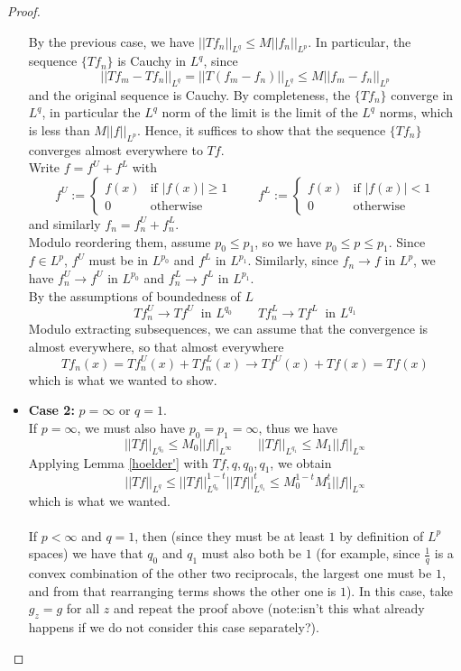 \begin{proof}
\begin{itemize}
{\begin{itemize}
{            By the previous case, we have $||Tf_n||_{L^q} \leq M ||f_n||_{L^p}$. In particular, the sequence $\{Tf_n\}$ is Cauchy in $L^q$, since
            \[ ||Tf_m - Tf_n||_{L^q} = ||T(f_m-f_n)||_{L^q} \leq M ||f_m - f_n||_{L^p} \]
            and the original sequence is Cauchy. By completeness, the $\{Tf_n\}$ converge in $L^q$, in particular the $L^q$ norm of the limit is the limit of the $L^q$ norms, which is less than $M ||f||_{L^p}$.
            Hence, it suffices to show that the sequence $\{Tf_n\}$ converges almost everywhere to $Tf$.\\
            Write $f= f^U + f^L$ with
            \[ f^U := \begin{cases} f(x) & \text{if } |f(x)|\geq 1 \\ 0 & \text{otherwise} \end{cases} \qquad f^L := \begin{cases} f(x) & \text{if } |f(x)|< 1 \\ 0 & \text{otherwise} \end{cases}  \]
            and similarly $f_n = f_n^U + f_n^L$.\\
            Modulo reordering them, assume $p_0 \leq p_1$, so we have $p_0 \leq p \leq p_1$. Since $f\in L^p$, $f^U$ must be in $L^{p_0}$ and $f^L$ in $L^{p_1}$.
            Similarly, since $f_n \to f$ in $L^p$, we have $f_n^U \to f^U$ in $L^{p_0}$ and $f_n^L \to f^L$ in $L^{p_1}$.\\
            By the assumptions of boundedness of $L$
            \[ Tf_n^U \to Tf^U \ \text{ in } L^{q_0} \qquad Tf_n^L \to Tf^L \ \text{ in } L^{q_1} \]
            Modulo extracting subsequences, we can assume that the convergence is almost everywhere, so that almost everywhere
            \[ Tf_n (x) = Tf_n^U (x) + Tf_n^L(x) \to Tf^U (x) + Tf(x) = Tf (x)\]
            which is what we wanted to show.
            }
        \end{itemize}
        }
        \item{\textbf{Case 2:} $p=\infty$ or $q=1$.\\
        If $p=\infty$, we must also have $p_0=p_1=\infty$, thus we have
        \[ ||Tf||_{L^{q_0}} \leq M_0 ||f||_{L^{\infty}} \qquad ||Tf||_{L^{q_1}} \leq M_1 ||f||_{L^{\infty}} \]
        Applying Lemma \ref{hoelder'} with $Tf, q, q_0, q_1$, we obtain
        \[||Tf||_{L^q} \leq ||Tf||_{L^{q_0}}^{1-t} ||Tf||_{L^{q_1}}^{t} \leq  M_0^{1-t} M_1^t ||f||_{L^{\infty}} \]
        which is what we wanted.\\\\
        If $p<\infty$ and $q=1$, then (since they must be at least $1$ by definition of $L^p$ spaces) we have that $q_0$ and $q_1$ must also both be $1$ (for example, since $\frac{1}{q}$ is a convex combination of the other two reciprocals, the largest one must be $1$, and from that rearranging terms shows the other one is $1$).
        In this case, take $g_z=g$ for all $z$ and repeat the proof above (note:isn't this what already happens if we do not consider this case separately?).
        }

      \end{itemize}


  \end{proof}

